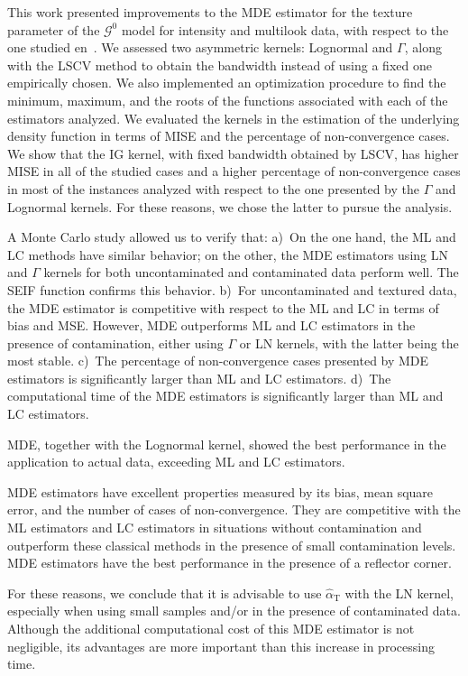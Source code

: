 \documentclass[twocolumn]{svjour3}
\begin{document}
		This work presented improvements to the MDE estimator for the texture parameter of the $\mathcal{G}^0$ model for intensity and multilook data, with respect to the one studied en~\cite{gambini2015}. 
		We assessed two asymmetric kernels: Lognormal and $\Gamma$, along with the LSCV method to obtain the bandwidth instead of using a fixed one empirically chosen.
		We also implemented an optimization procedure to find the minimum, maximum, and the roots of the functions associated with each of the estimators analyzed.
		We evaluated the kernels in the estimation of the underlying density function in terms of MISE and the percentage of non-convergence cases. 
		We show that the IG kernel, with fixed bandwidth obtained by LSCV, has higher MISE in all of the studied cases and a higher percentage of non-convergence cases in most of the instances analyzed with respect to the one presented by the $\Gamma$ and Lognormal kernels. 
		For these reasons, we chose the latter to pursue the analysis.
		
		A Monte Carlo study allowed us to verify that:
		a)~On the one hand, the ML and LC methods have similar behavior; on the other, the MDE estimators using LN and $\Gamma$ kernels for both uncontaminated and contaminated data perform well. 
		The SEIF function confirms this behavior.
		b)~For uncontaminated and textured data, the MDE estimator is competitive with respect to the ML and LC in terms of bias and MSE. 
		However, MDE outperforms ML and LC estimators in the presence of contamination, either using $\Gamma$ or LN kernels, with the latter being the most stable.
		c)~The percentage of non-convergence cases presented by MDE estimators is significantly larger than ML and LC estimators.
		d)~The computational time of the MDE estimators is significantly larger than ML and LC estimators.
		
		MDE, together with the Lognormal kernel, showed the best performance in the application to actual data, exceeding ML and LC estimators. 
		
		MDE estimators have excellent properties measured by its bias, mean square error, and the number of cases of non-convergence. 
		They are competitive with the ML estimators and LC estimators in situations without contamination and outperform these classical methods in the presence of small contamination levels. 
		MDE estimators have the best performance in the presence of a reflector corner.
		
		For these reasons, we conclude that it is advisable to use $\widehat{\alpha}_{\text{T}}$ with the LN kernel, especially when using small samples and/or in the presence of contaminated data. 
		Although the additional computational cost of this MDE estimator is not negligible, its advantages are more important than this increase in processing time.
		
\end{document}
